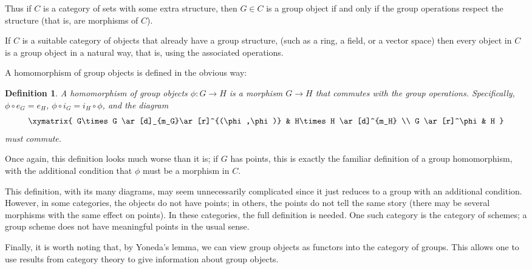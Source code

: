 \documentclass[12pt]{article}
\newtheorem{defn}{Definition}
\begin{document}
Thus if $C$ is a category of sets with some extra structure, then $G\in C$ is a group object if and only if the group operations respect the structure (that is, are morphisms of $C$).

If $C$ is a suitable category of objects that already have a group structure, (such as a ring, a field, or a vector space) then every object in $C$ is a group object in a natural way, that is, using the associated operations. 

A homomorphism of group objects is defined in the obvious way:


\begin{defn}
A \emph{homomorphism of group objects} $\phi:G\to H$ is a morphism $G\to H$ that commutes with the group operations.  Specifically, $\phi\circ e_G = e_H$, $\phi\circ i_G = i_H \circ\phi$, and the diagram
\[
\xymatrix{
G\times G \ar[d]_{m_G}\ar[r]^{(\phi,\phi)} & H\times H \ar[d]^{m_H} \\
G \ar[r]^\phi & H
}
\]
must commute.
\end{defn}

Once again, this definition looks much worse than it is; if $G$ has points, this is exactly the familiar definition of a group homomorphism, with the additional condition that $\phi$ must be a morphism in $C$.

This definition, with its many diagrams, may seem unnecessarily complicated since it just reduces to a group with an additional condition.  However, in some categories, the objects do not have points; in others, the points do not tell the same story (there may be several morphisms with the same effect on points). In these categories, the full definition is needed.  One such category is the category of schemes; a group scheme does not have meaningful points in the usual sense.

Finally, it is worth noting that, by Yoneda's lemma, we can view group objects as functors into the category of groups.  This allows one to use results from category theory to give information about group objects.
\end{document}
